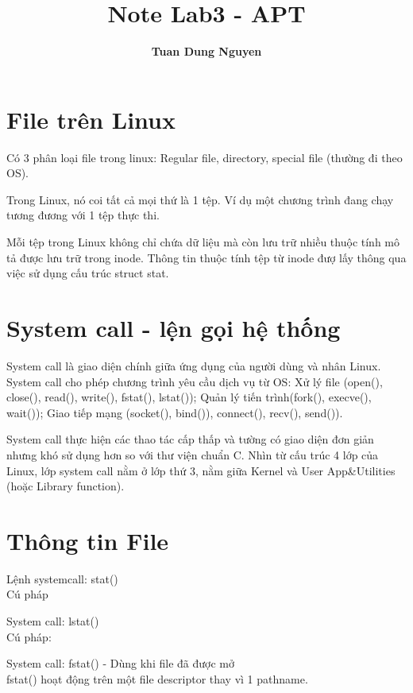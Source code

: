 \documentclass[12pt,a4paper,titlepage]{article}
\title{\textbf{Note Lab3 - APT}}
\author{\textbf{Tuan Dung Nguyen}}
\begin{document}
	\maketitle
	\tableofcontents
	\newpage
	\section{File trên Linux}
	Có 3 phân loại file trong linux: Regular file, directory, special file (thường đi theo OS).
	\par Trong Linux, nó coi tất cả mọi thứ là 1 tệp. Ví dụ một chương trình đang chạy tương đương với 1 tệp thực thi.
	\par Mỗi tệp trong Linux không chỉ chứa dữ liệu mà còn lưu trữ nhiều thuộc tính mô tả được lưu trữ trong inode. Thông tin thuộc tính tệp từ inode đượ lấy thông qua việc sử dụng cấu trúc struct stat.
	\section{System call - lện gọi hệ thống}
	\par System call là giao diện chính giữa ứng dụng của người dùng và nhân Linux. System call cho phép chương trình yêu cầu dịch vụ từ OS: Xử lý file (open(), close(), read(), write(), fstat(), lstat()); Quản lý tiến trình(fork(), execve(), wait()); Giao tiếp mạng (socket(), bind()), connect(), recv(), send()).
	\par System call thực hiện các thao tác cấp thấp và tường có giao diện đơn giản nhưng khó sử dụng hơn so với thư viện chuẩn C. Nhìn từ cấu trúc 4 lớp của Linux, lớp system call nằm ở lớp thứ 3, nằm giữa Kernel và User App\&Utilities (hoặc Library function).
	
	\section{Thông tin File}
	\par Lệnh systemcall: stat()\\
	Cú pháp
	\begin{center}
	\end{center}
	\par System call: lstat()\\
	Cú pháp:
	\begin{center}
	\end{center}
	\par System call: fstat() - Dùng khi file đã được mở\\
	fstat() hoạt động trên một file descriptor thay vì 1 pathname.
\end{document}
